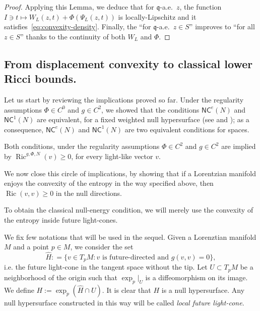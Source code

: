 \documentclass[12pt,a4paper]{amsart}
\theoremstyle{plain}
\theoremstyle{definition}
\numberwithin{equation}{section}
\DeclareMathOperator{\Ric}{Ric}
\newcommand{\NC}{\mathsf{NC}}
\newcommand{\q}{\mathfrak{q}}
\newcommand{\gflow}{\Psi}
\begin{document}
\begin{proof}
  Applying this Lemma, we deduce that for $\q$-a.e.\
  $z$,  the function $I \ni t\mapsto W_{L}(z,t)+\Phi(\gflow_L(z,t))$ is 
  locally-Lipschitz and it satisfies~\eqref{eq:convexity-density}.
  Finally, the ``for $\q$-a.e.\ $z\in S$'' improves to ``for all $z\in
  S$'' thanks to the continuity of both $W_{L}$ and $\Phi$.
\end{proof}



















\subsection{From 
displacement convexity to classical lower Ricci bounds.}
\label{Ss:futurecone}


Let us start by reviewing the implications proved so far.
Under the regularity assumptions
  $\Phi\in C^0$ and $g\in C^2$, we showed that
  the conditions $\NC^e(N)$ and $\NC^1(N)$ are equivalent,
  for a fixed weighted null hypersurface (see  and ); as a consequence, $\NC^e(N)$ and $\NC^1(N)$ are two equivalent
  conditions for spaces.

  Both conditions, under the regularity assumptions 
  $\Phi\in C^2$
  and $g\in C^2$ are implied by $\Ric^{g,\Phi,N}(v)\geq 0$, for every
  light-like vector $v$.

  We now close this circle of implications, by showing that if a
Lorentzian manifold enjoys the convexity of the entropy in the way
specified above, then $\Ric(v,v)\geq0$ 
in the null directions.



To obtain the classical null-energy condition, we will merely use the convexity of the entropy inside 
future light-cones.
%

We fix few notations that will be used in the sequel.
%
Given a Lorenztian manifold $M$ and a point $p\in M$, we
consider the set
\begin{equation}
  \hat H
  :
  =\{v\in T_pM: v
  \text{ is future-directed and }
  g(v,v)=0
  \},
\end{equation}
i.e.
the future light-cone in the tangent space without the tip.
%
Let $U\subset T_pM$ be a neighborhood of the origin such that
$\exp_p|_{U}$ is a diffeomorphism on its image.
%
We define $H:=\exp_p(\hat H\cap U)$.
%
It is clear that $H$ is a null hypersurface.
%
Any null hypersurface constructed in this way will be called \emph{local future
light-cone}.
%
\end{document}
